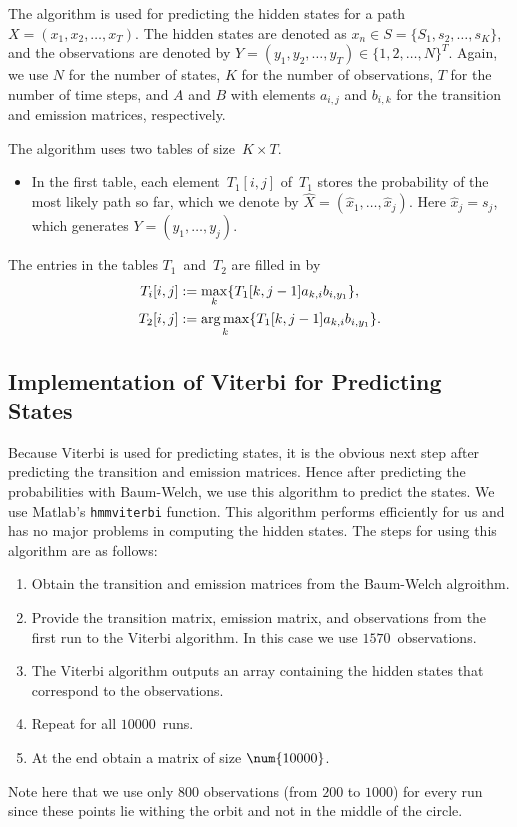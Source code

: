 \documentclass[twoside]{article}
\begin{document}
The algorithm is used for predicting the hidden states for a path ${X = (x_1, x_2, \ldots, x_T)}$.
The hidden states are denoted as ${x_n \in S = \{S_1, s_2, \ldots, s_K\}}$, and the observations are denoted by ${Y = (y_1, y_2, \ldots, y_T) \in {\{1, 2, \ldots, N\}}^T}$.
Again, we use $N$ for the number of states, $K$ for the number of observations, $T$ for the number of time steps, and $A$ and $B$ with elements $a_{i, j}$ and $b_{i, k}$ for the transition and emission matrices, respectively.

The algorithm uses two tables of size~${K \times T}$.
\begin{itemize}
\item In the first table, each element~$T_1[i, j]$ of~$T_1$ stores the probability of the most likely path so far, which we denote by ${\hat{X} = (\hat{x}_1,\ldots,\hat{x}_j)}$.
  Here ${\hat{x}_j = s_j}$, which generates ${Y = (y_1, \ldots, y_j)}$.
\end{itemize}

The entries in the tables $T_1$~and~$T_2$ are filled in by
\begin{align*}
  T_i[i, j] &:= \max_k \{T_1[k, j-1]a_{k, i} b_{i, y_1}\},\\
  T_2[i, j] &:= \operatorname*{arg\,max}_k \{T_1[k, j-1] a_{k, i} b_{i, y_1}\}.
\end{align*}

\subsection{Implementation of Viterbi for Predicting States}\label{sec:impl-viterbi-pred}

Because Viterbi is used for predicting states, it is the obvious next step after predicting the transition and emission matrices.
Hence after predicting the probabilities with Baum-Welch, we use this algorithm to predict the states.
We use Matlab's \texttt{\small{}hmmviterbi} function.
This algorithm performs efficiently for us and has no major problems in computing the hidden states.
The steps for using this algorithm are as follows:
\begin{enumerate}
\item Obtain the transition and emission matrices from the Baum-Welch algroithm.
\item Provide the transition matrix, emission matrix, and observations from the first run to the Viterbi algorithm.
  In this case we use $\num{1570}$~observations.
\item The Viterbi algorithm outputs an array containing the hidden states that correspond to the observations.
\item Repeat for all $\num{10000}$~runs.
\item At the end obtain a matrix of size ${\num{10000} \time 800}$.
\end{enumerate}
Note here that we use only $800$ observations (from $200$ to $\num{1000}$) for every run since these points lie withing the orbit and not in the middle of the circle.
\end{document}
